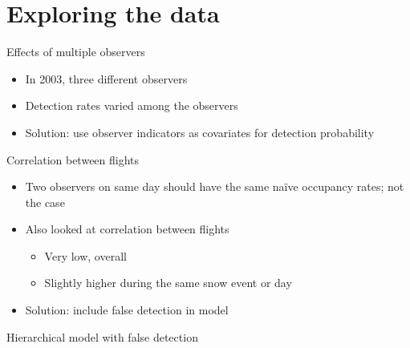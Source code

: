 \documentclass{beamer}
\begin{document}
\section{Exploring the data}
\begin{frame}{Effects of multiple observers}
	\begin{itemize}
		\item In 2003, three different observers
		\item Detection rates varied among the observers
		\item Solution: use observer indicators as covariates for detection 
		probability
	\end{itemize}
\end{frame}

\begin{frame}{Correlation between flights}
	\begin{itemize}
		\item Two observers on same day should have the same na\"ive occupancy 
		rates; not the case
		\item Also looked at correlation between flights
		\begin{itemize}
			\item Very low, overall
			\item Slightly higher during the same snow event or day
		\end{itemize}
		\item Solution: include false detection in model
	\end{itemize}
\end{frame}

\begin{frame}{Hierarchical model with false detection}
	\begin{center}
	\end{center}
\end{frame}
\end{document}
